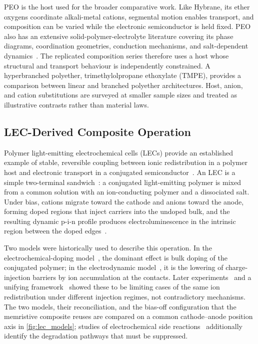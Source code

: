 \documentclass[12pt, twoside]{report}
\begin{document}
PEO is the host used for the broader comparative work. Like Hybrane, its ether oxygens coordinate alkali-metal cations, segmental motion enables transport, and composition can be varied while the electronic semiconductor is held fixed. PEO also has an extensive solid-polymer-electrolyte literature covering its phase diagrams, coordination geometries, conduction mechanisms, and salt-dependent dynamics~\cite{Wright1975, Berthier1983, RatnerShriver1988, Gray1991, Lightfoot1993}. The replicated composition series therefore uses a host whose structural and transport behaviour is independently constrained. A hyperbranched polyether, trimethylolpropane ethoxylate (TMPE), provides a comparison between linear and branched polyether architectures. Host, anion, and cation substitutions are surveyed at smaller sample sizes and treated as illustrative contrasts rather than material laws.

\subsection{LEC-Derived Composite Operation}\label{subsec:lec_composite_operation}

Polymer light-emitting electrochemical cells (LECs) provide an established example of stable, reversible coupling between ionic redistribution in a polymer host and electronic transport in a conjugated semiconductor~\cite{Tang2016}. An LEC is a simple two-terminal sandwich~\cite{Pei1995}: a conjugated light-emitting polymer is mixed from a common solution with an ion-conducting polymer and a dissociated salt. Under bias, cations migrate toward the cathode and anions toward the anode, forming doped regions that inject carriers into the undoped bulk, and the resulting dynamic p-i-n profile produces electroluminescence in the intrinsic region between the doped edges~\cite{Matyba2009}.

Two models were historically used to describe this operation. In the electrochemical-doping model~\cite{Pei1995, Smith1997}, the dominant effect is bulk doping of the conjugated polymer; in the electrodynamic model~\cite{deMello1998, deMello2002}, it is the lowering of charge-injection barriers by ion accumulation at the contacts. Later experiments~\cite{Matyba2009, Wagberg2008} and a unifying framework~\cite{vanReenen2010} showed these to be limiting cases of the same ion redistribution under different injection regimes, not contradictory mechanisms. The two models, their reconciliation, and the bias-off configuration that the memristive composite reuses are compared on a common cathode--anode position axis in \cref{fig:lec_models}; studies of electrochemical side reactions~\cite{Fang2008} additionally identify the degradation pathways that must be suppressed.
\end{document}
